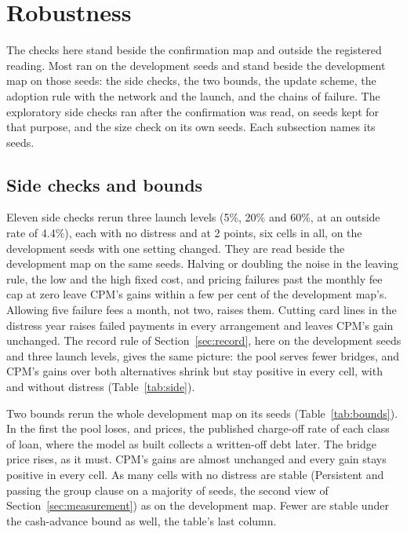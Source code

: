 \section{Robustness}\label{sec:robustness}

The checks here stand beside the confirmation map and outside the registered reading. Most ran
on the \NumSeedsDev{} development seeds and stand beside the development map on those seeds: the side checks,
the two bounds, the update scheme, the adoption rule with the network and the launch, and the chains of failure.
The exploratory side checks ran after the confirmation was read, on seeds kept for that purpose, and the size
check on its own seeds. Each subsection names its seeds.

\subsection{Side checks and bounds}

Eleven side checks rerun three launch levels (5\%, 20\% and 60\%, at an outside rate of 4.4\%), each with no
distress and at 2 points, six cells in all, on the development seeds with one setting changed. They are read beside the development map
on the same seeds. Halving or doubling the noise in the leaving rule, the low and the
high fixed cost, and pricing failures past the monthly fee cap at zero leave CPM's gains within a few per cent of
the development map's. Allowing five failure fees a month, not two, raises them. Cutting card lines in the
distress year raises failed payments in every arrangement and leaves CPM's gain unchanged. The record rule of
Section~\ref{sec:record}, here on the development seeds and three launch levels, gives the same picture: the pool serves
fewer bridges, and CPM's gains over both alternatives shrink but stay positive in every cell, with and without
distress (Table~\ref{tab:side}).

\begin{table}[htbp]\centering\small
\resizebox{\linewidth}{!}{}
\caption{Side checks on three cells at an outside rate of 4.4\%, one setting changed in each, on the development
seeds: CPM's gain in money, in dollars a person a year with no distress, and bridges served in years 4 and 5 at 2
points of distress.}
\label{tab:side}
\end{table}

Two bounds rerun the whole development map on its seeds (Table~\ref{tab:bounds}). In the first the pool loses, and
prices, the published charge-off rate of each class of loan, where the model as built collects a written-off debt
later. The bridge price rises, as it must. CPM's gains are almost unchanged and every gain stays positive in every
cell. As many cells with no distress are stable (Persistent and passing the group clause on a majority of seeds,
the second view of Section~\ref{sec:measurement}) as on the development map. Fewer are stable under the
cash-advance bound as well, the table's last column.

